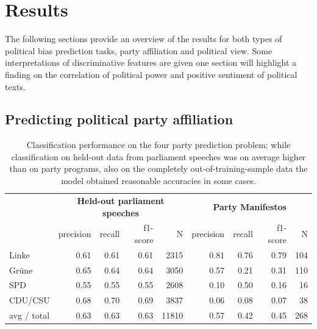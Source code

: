 \documentclass[runningheads,a4paper]{llncs}
\begin{document}
\section{Results}

The following sections provide an overview of the results for both types of political bias prediction tasks, party affiliation and political view. Some interpretations of discriminative features are given one section will highlight a finding on the correlation of political power and positive sentiment of political texts. 

\subsection{Predicting political party affiliation}


\begin{table}[t]
\begin{center}
\begin{tabular}{lrrrrrrrr}
& \multicolumn{4}{c}{\bf Held-out parliament speeches} & \multicolumn{4}{c}{\bf Party Manifestos}\\
    &         precision    &recall &  f1-score  & N    &         precision    &recall &  f1-score  & N\\
\hline \hline
      Linke     &  0.61    &  0.61  &    0.61   &   2315 &  0.81   &   0.76   &   0.79     &  104\\
     Gr\"une   &    0.65    &  0.64   &   0.64 &     3050 & 0.57  &     0.21  &    0.31    &   110\\
        SPD     &  0.55    &  0.55  &   0.55 &    2608 & 0.10  &    0.50   &   0.16    &    16\\
        CDU/CSU    &   0.68    &  0.70  &    0.69  &    3837 & 0.06   &   0.08  &    0.07   &     38 \\
\hline
avg / total    &   0.63  &    0.63  &    0.63 &    11810 & 0.57   &   0.42    &  0.45  &     268\\
%
\end{tabular}
\end{center}
\caption{
\label{tab:results_four_classes}
Classification performance on the four party prediction problem; while classification on held-out data from parliament speeches was on average higher than on party programs, also on the completely out-of-training-sample data the model obtained reasonable accuracies in some cases. 
}
\end{table}
\end{document}
